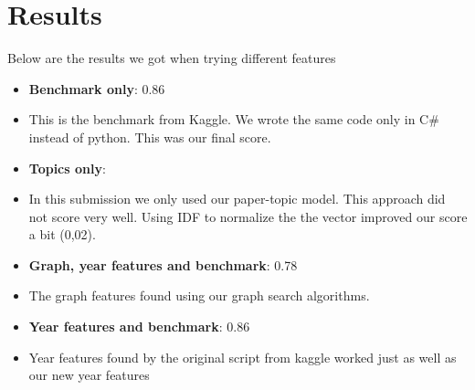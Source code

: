 \section{Results \label{sec:results}}

Below are the results we got when trying different features

\begin{itemize}
	\item[] \textbf{Benchmark only}: 0.86
	\item[] This is the benchmark from Kaggle. We wrote the same code only in C\# instead of python. This was our final score.
	\item[] \textbf{Topics only}: 
	\item[] In this submission we only used our paper-topic model. This approach did not score very well. Using IDF to normalize the the vector improved our score a bit (0,02). 
	\item[] \textbf{Graph, year features and benchmark}: 0.78
	\item[] The graph features found using our graph search algorithms.
	\item[] \textbf{Year features and  benchmark}: 0.86
	\item[] Year features found by the original script from kaggle worked just as well as our new year features
\end{itemize}



